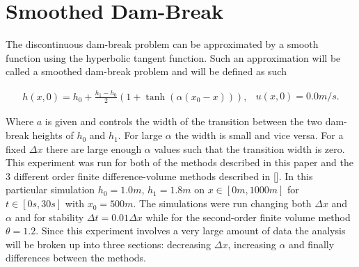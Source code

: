 \documentclass[SingleSpace,12pt,Proceedings]{Serre_ASCE}
\begin{document}

\section{Smoothed Dam-Break}
\label{section:smootheddambreak}
The discontinuous dam-break problem can be approximated by a smooth function using the hyperbolic tangent function. Such an approximation will be called a smoothed dam-break problem and will be defined as such
\begin{linenomath*}
\begin{subequations}
\begin{gather}
h(x,0) = h_0 + \frac{h_1 - h_0}{2}\left(1 + \tanh\left(\alpha\left(x_0 - x\right)\right)\right),
\end{gather}
\begin{gather}
u(x,0) = 0.0m/s.
\end{gather}
\end{subequations}
\label{eq:sdbi}
\end{linenomath*}
Where $a$ is given and controls the width of the transition between the two dam-break heights of $h_0$ and $h_1$. For large $\alpha$ the width is small and vice versa. For a fixed $\Delta x$ there are large enough $\alpha$ values such that the transition width is zero. This experiment was run for both of the methods described in this paper and the 3 different order finite difference-volume methods described in []. In this particular simulation $h_0 = 1.0m$, $h_1 = 1.8m$ on $x \in [0m,1000m]$ for $t \in [0s,30s]$ with $x_0 = 500m$. The simulations were run changing both $\Delta x$ and $\alpha$ and for stability $\Delta t = 0.01 \Delta x$ while for the second-order finite volume method $\theta = 1.2$. Since this experiment involves a very large amount of data the analysis will be broken up into three sections: decreasing $\Delta x$, increasing $\alpha$ and finally differences between the methods. 
\end{document}
